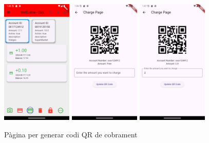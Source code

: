 \documentclass[a4paper,12pt,twoside]{ThesisStyle}
\begin{document}
\begin{figure}[h]
    \centering
    \includegraphics[width=0.3\textwidth]{imatges/mainPage3.png}
    \includegraphics[width=0.3\textwidth]{imatges/chargePage.png}
    \includegraphics[width=0.3\textwidth]{imatges/chargePageWithValue.png}
    \caption{ Pàgina per generar codi QR de cobrament}
    \label{fig: Pàgina per generar codi QR de cobrament}
\end{figure}
\end{document}
